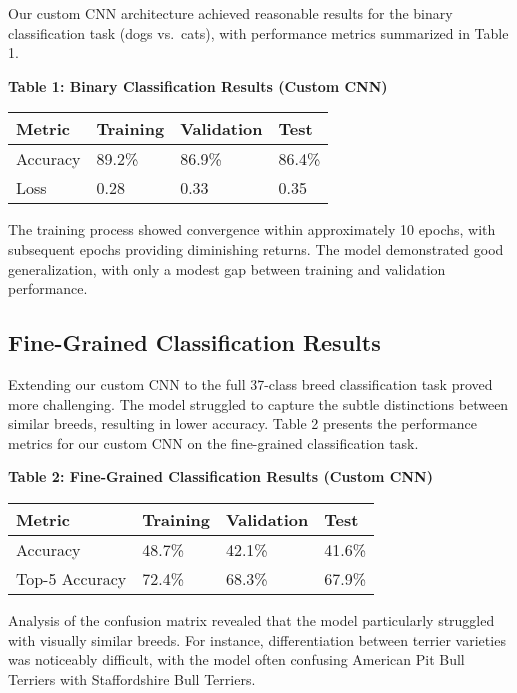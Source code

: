 \documentclass[
]{article}
\begin{document}
Our custom CNN architecture achieved reasonable results for the binary
classification task (dogs vs.~cats), with performance metrics summarized
in Table 1.

\textbf{Table 1: Binary Classification Results (Custom CNN)}

\begin{longtable}[]{@{}llll@{}}
\toprule\noalign{}
Metric & Training & Validation & Test \\
\midrule\noalign{}
\endhead
\bottomrule\noalign{}
\endlastfoot
Accuracy & 89.2\% & 86.9\% & 86.4\% \\
Loss & 0.28 & 0.33 & 0.35 \\
\end{longtable}

The training process showed convergence within approximately 10 epochs,
with subsequent epochs providing diminishing returns. The model
demonstrated good generalization, with only a modest gap between
training and validation performance.

\subsection{Fine-Grained Classification
Results}\label{fine-grained-classification-results}

Extending our custom CNN to the full 37-class breed classification task
proved more challenging. The model struggled to capture the subtle
distinctions between similar breeds, resulting in lower accuracy. Table
2 presents the performance metrics for our custom CNN on the
fine-grained classification task.

\textbf{Table 2: Fine-Grained Classification Results (Custom CNN)}

\begin{longtable}[]{@{}llll@{}}
\toprule\noalign{}
Metric & Training & Validation & Test \\
\midrule\noalign{}
\endhead
\bottomrule\noalign{}
\endlastfoot
Accuracy & 48.7\% & 42.1\% & 41.6\% \\
Top-5 Accuracy & 72.4\% & 68.3\% & 67.9\% \\
\end{longtable}

Analysis of the confusion matrix revealed that the model particularly
struggled with visually similar breeds. For instance, differentiation
between terrier varieties was noticeably difficult, with the model often
confusing American Pit Bull Terriers with Staffordshire Bull Terriers.
\end{document}
